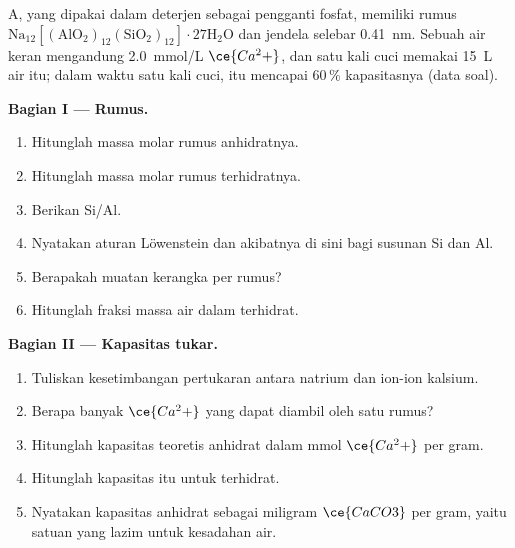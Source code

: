 \begin{problem}
\label{pb:b3:inorganic-materials:1}
 A, yang dipakai dalam deterjen sebagai pengganti fosfat, memiliki rumus
$\mathrm{Na_{12}[(AlO_2)_{12}(SiO_2)_{12}]\cdot 27H_2O}$ dan jendela selebar \qty{0.41}{nm}. Sebuah air keran mengandung
\qty{2.0}{mmol/L} $\ce{Ca^2+}$, dan satu kali cuci memakai \qty{15}{L} air itu; dalam waktu satu kali cuci,  itu
mencapai 60\,\% kapasitasnya (data soal).

\medskip\noindent\textbf{Bagian I --- Rumus.}
\begin{enumerate}[beginpenalty=10000]
  \item Hitunglah massa molar rumus anhidratnya.
  \item Hitunglah massa molar rumus terhidratnya.
  \item Berikan Si/Al.
  \item Nyatakan aturan Löwenstein dan akibatnya di sini bagi susunan
        Si dan Al.
  \item Berapakah muatan kerangka per rumus?
  \item Hitunglah fraksi massa air dalam  terhidrat.
\end{enumerate}

\medskip\noindent\textbf{Bagian II --- Kapasitas tukar.}
\begin{enumerate}[resume, beginpenalty=10000]
  \item Tuliskan kesetimbangan pertukaran antara  natrium dan ion-ion
        kalsium.
  \item Berapa banyak $\ce{Ca^2+}$ yang dapat diambil oleh satu rumus?
  \item Hitunglah kapasitas teoretis  anhidrat dalam mmol $\ce{Ca^2+}$
        per gram.
  \item Hitunglah kapasitas itu untuk  terhidrat.
  \item Nyatakan kapasitas anhidrat sebagai miligram $\ce{CaCO3}$ per gram, yaitu satuan yang lazim
        untuk kesadahan air.
\end{enumerate}


\end{problem}
